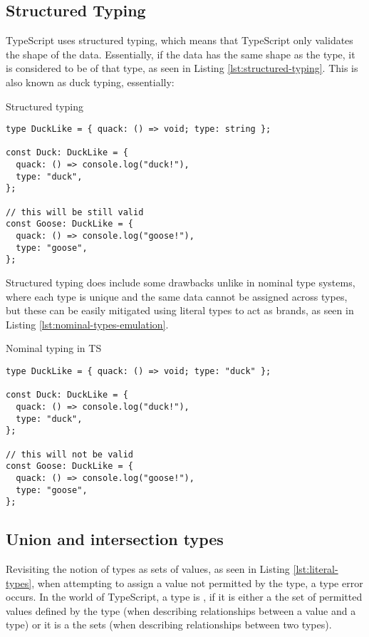 \subsection{Structured Typing}

TypeScript uses structured typing, which means that TypeScript only validates the shape of the data. Essentially, if the data has the same shape as the type, it is considered to be of that type, as seen in Listing \ref{lst:structured-typing}. This is also known as duck typing, essentially: 

\begin{listing}[ht]
  \caption{Structured typing}\label{lst:structured-typing}
  \begin{verbatim}
type DuckLike = { quack: () => void; type: string };

const Duck: DuckLike = {
  quack: () => console.log("duck!"),
  type: "duck",
};

// this will be still valid
const Goose: DuckLike = {
  quack: () => console.log("goose!"),
  type: "goose",
};
\end{verbatim}
\end{listing}

Structured typing does include some drawbacks unlike in nominal type systems, where each type is unique and the same data cannot be assigned across types, but these can be easily mitigated using literal types to act as brands, as seen in Listing \ref{lst:nominal-types-emulation}.

\begin{listing}[ht]
  \caption{Nominal typing in TS}\label{lst:nominal-types-emulation}
  \begin{verbatim}
type DuckLike = { quack: () => void; type: "duck" };

const Duck: DuckLike = {
  quack: () => console.log("duck!"),
  type: "duck",
};

// this will not be valid
const Goose: DuckLike = {
  quack: () => console.log("goose!"),
  type: "goose",
};
\end{verbatim}
\end{listing}

\subsection{Union and intersection types}

Revisiting the notion of types as sets of values, as seen in Listing \ref{lst:literal-types}, when attempting to assign a value not permitted by the  type, a type error occurs. In the world of TypeScript, a type is , if it is either a  the set of permitted values defined by the type (when describing relationships between a value and a type) or it is a  the sets (when describing relationships between two types).

